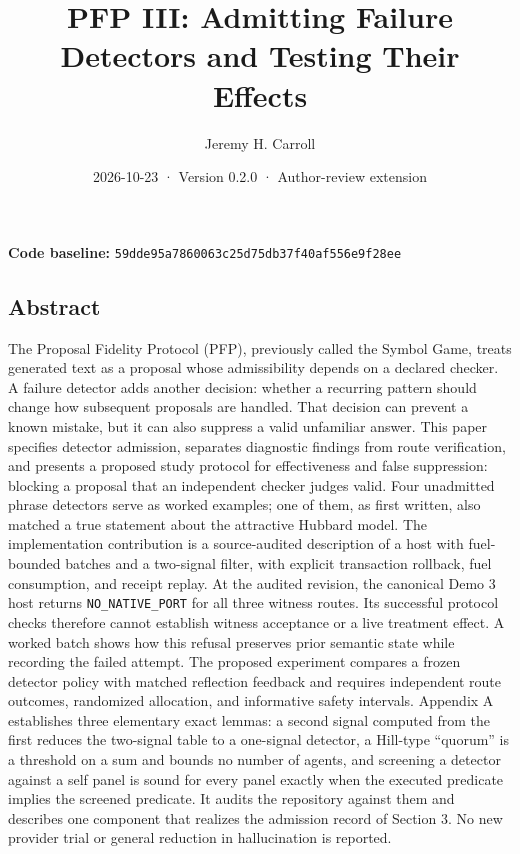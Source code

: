 \documentclass[
  11pt,
]{article}
\title{PFP III: Admitting Failure Detectors and Testing Their Effects}
\author{Jeremy H. Carroll}
\date{2026-10-23 · Version 0.2.0 · Author-review extension}
\begin{document}
\makeatletter
\begin{center}
{\LARGE \@title\par}
\vspace{0.8em}
{\normalsize \@author\par}
\vspace{0.5em}
{\small \@date\par}
\end{center}
\makeatother

\textbf{Code baseline:}
\nolinkurl{59dde95a7860063c25d75db37f40af556e9f28ee}

\subsection{Abstract}\label{abstract}

The Proposal Fidelity Protocol (PFP), previously called the Symbol Game,
treats generated text as a proposal whose admissibility depends on a
declared checker. A failure detector adds another decision: whether a
recurring pattern should change how subsequent proposals are handled.
That decision can prevent a known mistake, but it can also suppress a
valid unfamiliar answer. This paper specifies detector admission,
separates diagnostic findings from route verification, and presents a
proposed study protocol for effectiveness and false suppression:
blocking a proposal that an independent checker judges valid. Four
unadmitted phrase detectors serve as worked examples; one of them, as
first written, also matched a true statement about the attractive
Hubbard model. The implementation contribution is a source-audited
description of a host with fuel-bounded batches and a two-signal filter,
with explicit transaction rollback, fuel consumption, and receipt
replay. At the audited revision, the canonical Demo 3 host returns
\nolinkurl{NO_NATIVE_PORT} for all three witness routes. Its successful
protocol checks therefore cannot establish witness acceptance or a live
treatment effect. A worked batch shows how this refusal preserves prior
semantic state while recording the failed attempt. The proposed
experiment compares a frozen detector policy with matched reflection
feedback and requires independent route outcomes, randomized allocation,
and informative safety intervals. Appendix A establishes three
elementary exact lemmas: a second signal computed from the first reduces
the two-signal table to a one-signal detector, a Hill-type ``quorum'' is
a threshold on a sum and bounds no number of agents, and screening a
detector against a self panel is sound for every panel exactly when the
executed predicate implies the screened predicate. It audits the
repository against them and describes one component that realizes the
admission record of Section 3. No new provider trial or general
reduction in hallucination is reported.
\end{document}
